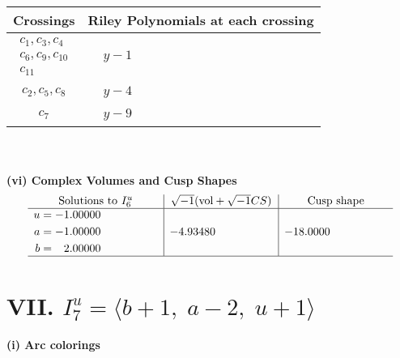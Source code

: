 \documentclass[1p]{elsarticle_modified}
\theoremstyle{definition}
\newcommand{\I}{\sqrt{-1}}
\begin{document}
\begin{tabular}{m{50pt}|m{274pt}}
Crossings & \hspace{64pt}Riley Polynomials at each crossing \\
\hline $$\begin{aligned}c_{1},c_{3},c_{4}\\c_{6},c_{9},c_{10}\\c_{11}\end{aligned}$$&$\begin{aligned}
&y-1
\end{aligned}$\\
\hline $$\begin{aligned}c_{2},c_{5},c_{8}\end{aligned}$$&$\begin{aligned}
&y-4
\end{aligned}$\\
\hline $$\begin{aligned}c_{7}\end{aligned}$$&$\begin{aligned}
&y-9
\end{aligned}$\\
\hline
\end{tabular}\\~\\
\newpage\flushleft \textbf{(vi) Complex Volumes and Cusp Shapes}
$$\begin{array}{c|c|c}  
\text{Solutions to }I^u_{6}& \I (\text{vol} + \sqrt{-1}CS) & \text{Cusp shape}\\
 \hline 
\begin{aligned}
u &= -1.00000\phantom{ +0.000000I} \\
a &= -1.00000\phantom{ +0.000000I} \\
b &= \phantom{-}2.00000\phantom{ +0.000000I}\end{aligned}
 & -4.93480\phantom{ +0.000000I} & -18.0000\phantom{ +0.000000I}\\
 \hline 
 \end{array}$$\newpage\newpage\renewcommand{\arraystretch}{1}
\centering \section*{VII. $I^u_{7}= \langle b+1,\;a-2,\;u+1 \rangle$}
\flushleft \textbf{(i) Arc colorings}\\
\end{document}
